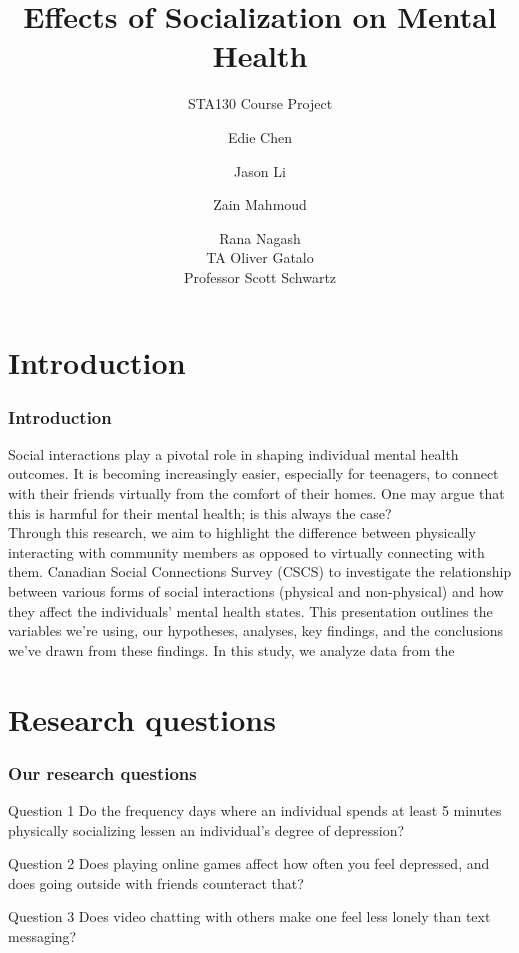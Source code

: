 \documentclass{beamer}
\title[Social Connections Analysis]
{Effects of Socialization on Mental Health}
\subtitle{STA130 Course Project}
\author[STA130] %
{Edie Chen \and Jason Li \and Zain Mahmoud \and Rana Nagash\\
TA Oliver Gatalo\\
Professor Scott Schwartz}
\institute[UofT] %
{
  STA130: An Introduction to Statistical Reasoning and Data Science\\
  Department of Statistical Sciences\\
  University of Toronto
}
\date[November 2024] %
\begin{document}
\frame{\titlepage}


\section{Introduction}

\begin{frame}
\frametitle{Introduction}
Social interactions play a pivotal role in shaping individual mental health outcomes. It is becoming increasingly easier, especially for teenagers, to connect with their friends virtually from the comfort of their homes. One may argue that this is harmful for their mental health; is this always the case?\\
Through this research, we aim to highlight the difference between physically interacting with community members as opposed to virtually connecting with them. \alert{Canadian Social Connections Survey (CSCS)} to investigate the relationship between various forms of social interactions (physical and non-physical) and how they affect the individuals' mental health states. 
This presentation outlines the variables we're using, our hypotheses, analyses, key findings, and the conclusions we've drawn from these findings.
In this study, we analyze data from the 
\end{frame}


\section{Research questions}

\begin{frame}
\frametitle{Our research questions}

\begin{block}{Question 1}
Do the frequency days where an individual spends at least 5 minutes physically socializing lessen an individual’s degree of depression?
\end{block}

\begin{block}{Question 2}
Does playing online games affect how often you feel depressed, and does going outside with friends counteract that? 
\end{block}

\begin{block}{Question 3}
    Does video chatting with others make one feel less lonely than text messaging? 
\end{block}
\end{frame}
\end{document}
